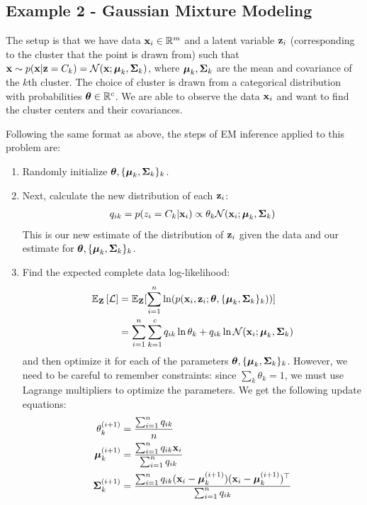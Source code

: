 \documentclass[12pt,letterpaper]{article}
\begin{document}
\subsection{Example 2 - Gaussian Mixture Modeling}

The setup is that we have data $\mathbf{x}_i \in \mathbb{R}^{m}$ and a latent variable $\mathbf{z}_i$ (corresponding to the cluster that the point is drawn from) such that $\mathbf{x} \sim p(\mathbf{x} | \mathbf{z} = C_k) = \mathcal{N}(\mathbf{x}; \boldsymbol{\mu}_k, \mathbf{\Sigma}_k)$, where $\boldsymbol{\mu}_k, \mathbf{\Sigma}_k$ are the mean and covariance of the $k$th cluster. The choice of cluster is drawn from a categorical distribution with probabilities $\boldsymbol{\theta} \in \mathbb{R}^c$. We are able to observe the data $\mathbf{x}_i$ and want to find the cluster centers and their covariances.

Following the same format as above, the steps of EM inference applied to this problem are:
\begin{enumerate}
    \item Randomly initialize $\boldsymbol{\theta}, \{\boldsymbol{\mu}_k, \mathbf{\Sigma}_k\}_k$.
    \item Next, calculate the new distribution of each $\mathbf{z}_i$:
        \begin{align}
            q_{ik} = p(z_i = C_k | \mathbf{x}_i) \propto \theta_k \mathcal{N}(\mathbf{x}_i; \boldsymbol{\mu}_k, \mathbf{\Sigma}_k)
        \end{align}
    This is our new estimate of the distribution of $\mathbf{z}_i$ given the data and our estimate for $\boldsymbol{\theta}, \{\boldsymbol{\mu}_k, \mathbf{\Sigma}_k\}_k$.
    \item Find the expected complete data log-likelihood:
    \begin{align}
         \mathbb{E}_{\mathbf{Z}}\left[\mathcal{L}\right] &= \mathbb{E}_{\mathbf{Z}}[\sum_{i = 1}^n \ln(p(\mathbf{x}_i, \mathbf{z}_i; \boldsymbol{\theta}, \{\boldsymbol{\mu}_k, \mathbf{\Sigma}_k\}_k))] \\
         &= \sum_{i = 1}^n\sum_{k = 1}^c q_{ik} \ln \theta_k + q_{ik} \ln \mathcal{N}(\mathbf{x}_i; \boldsymbol{\mu}_k, \mathbf{\Sigma}_k) 
    \end{align}
    and then optimize it for each of the parameters $\boldsymbol{\theta}, \{\boldsymbol{\mu}_k, \mathbf{\Sigma}_k\}_k$. However, we need to be careful to remember constraints: since $\sum_k \theta_k = 1$, we must use Lagrange multipliers to optimize the parameters. We get the following update equations:
    \begin{align}
        \theta_k^{(i + 1)} &= \frac{\sum_{i = 1}^n q_{ik}}{n} \\
        \boldsymbol{\mu}_k^{(i + 1)} &= \frac{\sum_{i = 1}^n q_{ik}\mathbf{x}_i}{\sum_{i = 1}^n q_{ik}} \\
        \mathbf{\Sigma}_k^{(i + 1)} &= \frac{\sum_{i = 1}^n q_{ik}(\mathbf{x}_i - \boldsymbol{\mu}_k^{(i + 1)})(\mathbf{x}_i - \boldsymbol{\mu}_k^{(i + 1)})^{\top}}{\sum_{i = 1}^n q_{ik}}
    \end{align}
\end{enumerate}
\end{document}
